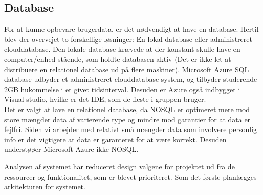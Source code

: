 \documentclass[Rapport/Rapport_main.tex]{subfiles}
\begin{document}
\subsection{Database}
For at kunne opbevare brugerdata, er det nødvendigt at have en database. Hertil blev der overvejet to forskellige løsninger: En lokal database eller administreret clouddatabase. Den lokale database krævede at der konstant skulle have en computer/enhed stående, som holdte databasen aktiv (Det er ikke let at distribuere en relationel database ud på flere maskiner). Microsoft Azure SQL database udbyder et administreret clouddatabase system, og tilbyder studerende 2GB hukommelse i et givet tidsinterval. Desuden er Azure også indbygget i Visual studio, hvilke er det IDE, som de fleste i gruppen bruger. \\
Det er valgt at lave en relationel database, da NOSQL er optimeret mere mod store mængder data af varierende type og mindre mod garantier for at data er fejlfri. Siden vi arbejder med relativt små mængder data som involvere personlig info er det vigtigere at data er garanteret for at være korrekt. Desuden understøøer Microsoft Azure ikke NOSQL.

Analysen af systemet har reduceret design valgene for projektet ud fra de ressourcer og funktionalitet, som er blevet prioriteret. Som det første planlægges arkitekturen for systemet. 
\end{document}
